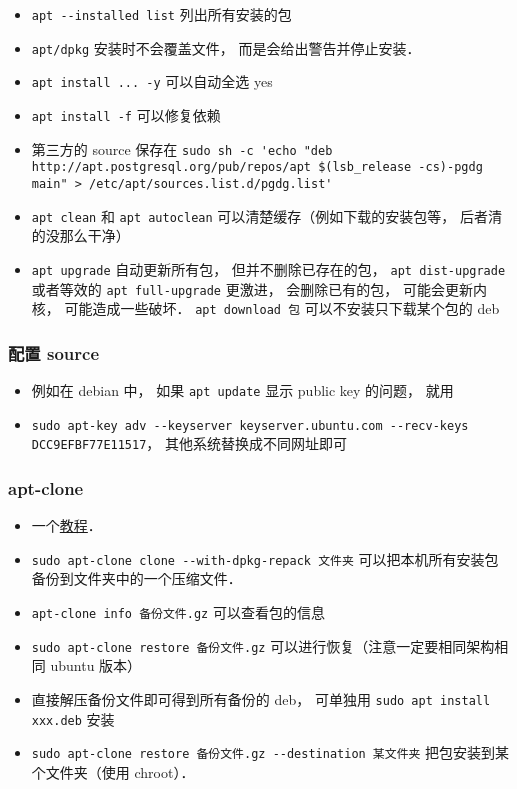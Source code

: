 \begin{itemize}
\item \verb|apt --installed list| 列出所有安装的包
\item \verb|apt/dpkg| 安装时不会覆盖文件， 而是会给出警告并停止安装．
\item \verb|apt install ... -y| 可以自动全选 yes
\item \verb|apt install -f| 可以修复依赖
\item 第三方的 source 保存在 \verb|sudo sh -c 'echo "deb http://apt.postgresql.org/pub/repos/apt $(lsb_release -cs)-pgdg main" > /etc/apt/sources.list.d/pgdg.list'|
\item \verb|apt clean| 和 \verb|apt autoclean| 可以清楚缓存（例如下载的安装包等， 后者清的没那么干净）
\item \verb|apt upgrade| 自动更新所有包， 但并不删除已存在的包， \verb|apt dist-upgrade| 或者等效的 \verb|apt full-upgrade| 更激进， 会删除已有的包， 可能会更新内核， 可能造成一些破坏．
\verb|apt download 包| 可以不安装只下载某个包的 deb
\end{itemize}

\subsubsection{配置 source}
\begin{itemize}
\item 例如在 debian 中， 如果 \verb|apt update| 显示 public key 的问题， 就用
\item \verb|sudo apt-key adv --keyserver keyserver.ubuntu.com --recv-keys DCC9EFBF77E11517|， 其他系统替换成不同网址即可
\end{itemize}

\subsubsection{apt-clone}
\begin{itemize}
\item 一个\href{https://ubunlog.com/en/apt-clone-copia-seguridad-paquetes/}{教程}．
\item \verb|sudo apt-clone clone --with-dpkg-repack 文件夹| 可以把本机所有安装包备份到文件夹中的一个压缩文件．
\item \verb|apt-clone info 备份文件.gz| 可以查看包的信息
\item \verb|sudo apt-clone restore 备份文件.gz| 可以进行恢复（注意一定要相同架构相同 ubuntu 版本）
\item 直接解压备份文件即可得到所有备份的 deb， 可单独用 \verb|sudo apt install xxx.deb| 安装
\item \verb|sudo apt-clone restore 备份文件.gz --destination 某文件夹| 把包安装到某个文件夹（使用 chroot）．
\end{itemize}



